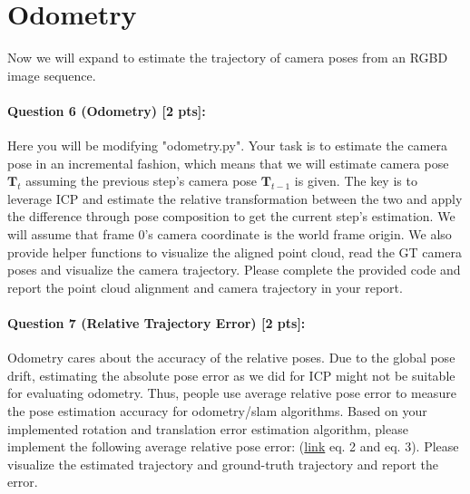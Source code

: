 \documentclass[11pt]{article}
\begin{document}
\section*{Odometry} 
Now we will expand to estimate the trajectory of camera poses from an RGBD image sequence.

\paragraph{Question 6 (Odometry) [2 pts]:}
Here you will be modifying "odometry.py". Your task is to estimate the camera pose in an incremental fashion, which means that we will estimate camera pose $\mathbf{T}_t$ assuming the previous step's camera pose $\mathbf{T}_{t-1}$ is given. The key is to leverage ICP and estimate the relative transformation between the two and apply the difference through pose composition to get the current step's estimation. We will assume that frame 0's camera coordinate is the world frame origin. We also provide helper functions to visualize the aligned point cloud, read the GT camera poses and visualize the camera trajectory. Please complete the provided code and report the point cloud alignment and camera trajectory in your report. 

\paragraph{Question 7 (Relative Trajectory Error) [2 pts]:}
Odometry cares about the accuracy of the relative poses. Due to the global pose drift, estimating the absolute pose error as we did for ICP might not be suitable for evaluating odometry. Thus, people use average relative pose error to measure the pose estimation accuracy for odometry/slam algorithms. Based on your implemented rotation and translation error estimation algorithm, please implement the following average relative pose error: (\href{http://www.cvlibs.net/publications/Geiger2012CVPR.pdf}{link} eq. 2 and eq. 3). Please visualize the estimated trajectory and ground-truth trajectory and report the error. 
\end{document}
